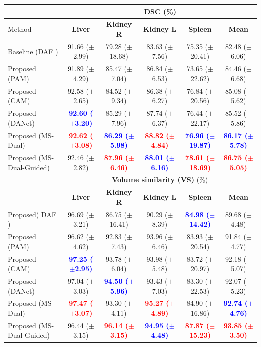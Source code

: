 \documentclass[journal]{IEEEtran}
\begin{document}
\begin{table}[ht!]
\centering
\scriptsize
\begin{tabular}{lcccc|c}\\
\toprule
 & \multicolumn{5}{c}{\textbf{DSC} (\%)}\\
 \midrule
Method & \textbf{Liver} & \textbf{Kidney R} & \textbf{Kidney L} & \textbf{Spleen} & \textbf{Mean}  \\
\midrule
Baseline (DAF \cite{wang18d})  &  91.66 ($\pm$2.99) & 79.28 ($\pm$18.68)& 83.63 ($\pm$7.56) &  75.35 ($\pm$20.41)&  82.48 ($\pm$6.06)   \\
Proposed (PAM)     &  91.89 ($\pm$4.29)& 85.47 ($\pm$7.04)& 86.84 ($\pm$6.53)  & 73.65 ($\pm$22.62)& 84.46 ($\pm$6.68)   \\
Proposed (CAM)     &  92.58 ($\pm$2.65) & 84.52 ($\pm$9.34)& 86.38 ($\pm$6.27)& 76.84 ($\pm$20.56) & 85.08 ($\pm$5.62)\\
Proposed (DANet) &  \textcolor{blue}{\textbf{92.60 ($\pm$3.20)}} & 85.29 ($\pm$7.96) & 87.74 ($\pm$6.37)& 76.44 ($\pm$22.17)&  85.52 ($\pm$5.86)       \\
Proposed (MS-Dual)  & \textcolor{red}{\textbf{92.62 ($\pm$3.08)}}  & \textcolor{blue}{\textbf{86.29 ($\pm$5.98)}} & \textcolor{red}{\textbf{88.82 ($\pm$4.84)}}  & \textcolor{blue}{\textbf{76.96 ($\pm$19.87)}} &  \textcolor{blue}{\textbf{86.17 ($\pm$5.78)}}\\
Proposed (MS-Dual-Guided)  & 92.46 ($\pm$2.82)  & \textcolor{red}{\textbf{87.96 ($\pm$6.46)}}& \textcolor{blue}{\textbf{88.01 ($\pm$6.16)}}  & \textcolor{red}{\textbf{78.61 ($\pm$18.69)}} &  \textcolor{red}{\textbf{86.75 ($\pm$5.05)}}\\
\midrule
& \multicolumn{5}{c}{\textbf{Volume similarity (VS)} (\%)}\\
 \midrule
 & \textbf{Liver} & \textbf{Kidney R} & \textbf{Kidney L} & \textbf{Spleen} & \textbf{Mean}  \\

\midrule
Proposed( DAF \cite{wang18d})  &  96.69 ($\pm$3.21) & 86.75 ($\pm$16.41) & 90.29 ($\pm$8.39) & \textcolor{blue}{\textbf{84.98 ($\pm$14.42)}} &   89.68 ($\pm$4.48)  \\
Proposed (PAM)     & 96.62 ($\pm$4.62)& 92.83 ($\pm$7.43)& 93.96 ($\pm$6.46)& 83.93 ($\pm$20.54)&  91.84 ($\pm$4.77) \\
Proposed (CAM)     & \textcolor{blue}{\textbf{97.25 ($\pm$2.95)}}  & 93.78 ($\pm$6.04)& 93.98 ($\pm$5.48)& 83.72 ($\pm$20.97)& 92.18 ($\pm$5.07)\\
Proposed (DANet) &  97.04 ($\pm$3.03)& \textcolor{blue}{\textbf{94.50 ($\pm$5.96)}} & 93.43 ($\pm$7.03)& 83.30 ($\pm$22.53)&  92.07 ($\pm$5.23)     \\
Proposed (MS-Dual)  & \textcolor{red}{\textbf{97.47 ($\pm$3.07)}}  & 93.30 ($\pm$4.11)& \textcolor{red}{\textbf{95.27 ($\pm$4.89)}}  & 84.90 ($\pm$16.86) & \textcolor{blue}{\textbf{92.74 ($\pm$4.76)}} \\
Proposed (MS-Dual-Guided)  &  96.44 ($\pm$3.15)  & \textcolor{red}{\textbf{96.14 ($\pm$3.15)}}& \textcolor{blue}{\textbf{94.95 ($\pm$4.48)}}  & \textcolor{red}{\textbf{87.87 ($\pm$15.23)}} & \textcolor{red}{\textbf{93.85 ($\pm$3.50)}} \\


\end{tabular}
\end{table}
\end{document}
